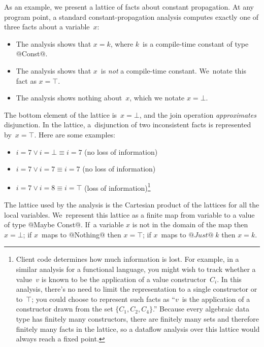 \documentclass[blockstyle,preprint,nocopyrightspace]{sigplanconf}
\begin{document}
As an example, 
we present a lattice of facts about constant propagation.
At any program point, a standard constant-propagation analysis
computes exactly one of three
facts about a variable~$x$:
\begin{itemize}
\item
The analysis shows that
$x = k$, where $k$~is a compile-time constant of type @Const@.
\item
The analysis shows that $x$~is \emph{not} a compile-time constant.
We~notate this fact as $x = \top$.
\item
The analysis shows nothing about~$x$, which we notate $x=\bot$.
\end{itemize}
The bottom element of the lattice is~$x=\bot$, and
the join operation \emph{approximates} disjunction.
In the lattice, a~disjunction of two inconsistent facts is represented by~$x=\top$.
Here are some examples:
\begin{itemize}
\item
$i = 7 \lor i=\bot \equiv i=7$ (no loss of information)
\item
$i = 7 \lor i= 7 \equiv  i=7$ (no loss of information)
\item
$i = 7 \lor i = 8 \equiv i = \top$ (loss of information)\footnote
{Client code determines how much information is lost.
For example, in a similar analysis for a functional language,
you might wish to track whether a value~$v$ is known to
be the application of a value constructor~$C_i$.
In this analysis, there's no need to limit the representation to a
single constructor or to~$\top$;
you could choose to represent such facts as ``$v$~is
the application of a constructor drawn from the set $\{C_1, C_2,
C_4\}$.''
Because every algebraic data type has finitely many constructors,
there are finitely many sets and therefore finitely many facts in the
lattice, so a dataflow analysis over this lattice would always reach a
fixed point.
}

\end{itemize}

The lattice  used by the analysis is the Cartesian product of the
lattices for all the local variables.
We~represent this lattice as a finite map from variable
to a value of type @Maybe Const@.
If~a variable $x$ is not in the domain of the map then $x=\bot$;
if $x$~maps to @Nothing@ then $x=\top$; if $x$~maps to $@Just@\;k$ then
$x=k$.
\end{document}

